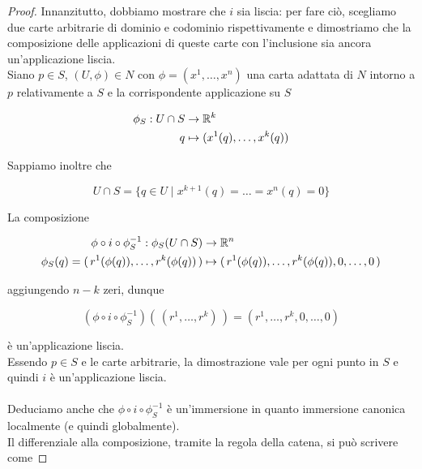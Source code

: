 \begin{proof}
	Innanzitutto, dobbiamo mostrare che $ i $ sia liscia: per fare ciò, scegliamo due carte arbitrarie di dominio e codominio rispettivamente e dimostriamo che la composizione delle applicazioni di queste carte con l'inclusione sia ancora un'applicazione liscia.\\
	Siano $ p \in S $, $ (U,\phi) \in N $ con $ \phi = (x^{1},\dots,x^{n}) $ una carta adattata di $ N $ intorno a $ p $ relativamente a $ S $ e la corrispondente applicazione su $ S $
	
	\begin{align}
		\begin{split}
			\phi_{S} : U \cap S &\to \mathbb{R}^{k}\\
			q &\mapsto (x^{1}(q),\dots,x^{k}(q))
		\end{split}
	\end{align}
	
	Sappiamo inoltre che
	
	\begin{equation}
		U \cap S = \{ q \in U \mid x^{k+1}(q) = \dots = x^{n}(q) = 0 \}
	\end{equation}

	La composizione
	
	\begin{align}
		\begin{split}
			\phi \circ i \circ \phi_{S}^{-1} : \phi_{S}(U \cap S) &\to \mathbb{R}^{n}\\
			\phi_{S}(q) = (\, r^{1}(\phi(q)),\dots,r^{k}(\phi(q)) \,) &\mapsto (\, r^{1}(\phi(q)),\dots,r^{k}(\phi(q)),0,\dots,0 \,)
		\end{split}
	\end{align}
	
	aggiungendo $ n-k $ zeri, dunque
	
	\begin{equation}
		(\phi \circ i \circ \phi_{S}^{-1}) (\, (r^{1},\dots,r^{k}) \,) = (r^{1},\dots,r^{k},0,\dots,0)
	\end{equation}

	è un'applicazione liscia.\\	
	Essendo $ p \in S $ e le carte arbitrarie, la dimostrazione vale per ogni punto in $ S $ e quindi $ i $ è un'applicazione liscia.\\\\
	Deduciamo anche che $ \phi \circ i \circ \phi_{S}^{-1} $ è un'immersione in quanto immersione canonica localmente (e quindi globalmente).\\
	Il differenziale alla composizione, tramite la regola della catena, si può scrivere come
	

\end{proof}
